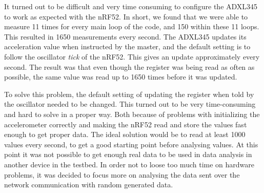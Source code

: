 \noindent It turned out to be difficult and very time consuming to configure the \gls{ADXL345} to work as expected with the \gls{nRF52}. In short, we found that we were able to measure 11 times for every main loop of the code, and 150 within these 11 loops. This resulted in 1650 measurements every second. The \gls{ADXL345} updates its acceleration value when instructed by the master, and the default setting is to follow the oscillator \textit{tick} of the \gls{nRF52}. This gives an update approximately every second.  The result was that even though the register was being read as often as possible, the same value was read up to 1650 times before it was updated.

\noindent To solve this problem, the default setting of updating the register when told by the oscillator needed to be changed. This turned out to be very time-consuming and hard to solve in a proper way. Both because of problems with initializing the accelerometer correctly and making the \gls{nRF52} read and store the values fast enough to get proper data. The ideal solution would be to read at least 1000 values every second, to get a good starting point before analysing values. At this point it was not possible to get enough real data to be used in data analysis in another device in the testbed. In order not to loose too much time on hardware problems, it was decided to focus more on analysing the data sent over the network communication with random generated data. 



